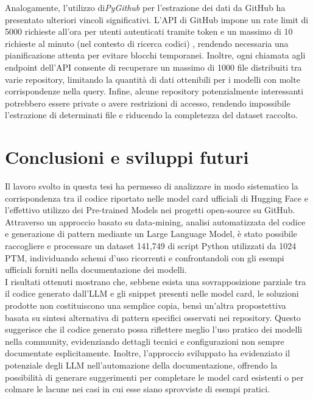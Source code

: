 \documentclass{article}
\begin{document}
Analogamente, l’utilizzo di\textit{PyGithub} per l'estrazione dei dati da GitHub ha presentato ulteriori vincoli significativi. L’API di GitHub impone un rate limit di 5000 richieste all’ora per utenti autenticati tramite token e un massimo di 10 richieste al minuto (nel contesto di ricerca codici) , rendendo necessaria una pianificazione attenta per evitare blocchi temporanei. Inoltre, ogni chiamata agli endpoint dell’API consente di recuperare un massimo di 1000 file distribuiti tra varie repository, limitando la quantità di dati ottenibili per i modelli con molte corrispondenze nella query. Infine, alcune repository potenzialmente interessanti potrebbero essere private o avere restrizioni di accesso, rendendo impossibile l’estrazione di determinati file e riducendo la completezza del dataset raccolto.

\section{Conclusioni e sviluppi futuri}
Il lavoro svolto in questa tesi ha permesso di analizzare in modo sistematico la corrispondenza tra il codice riportato nelle model card ufficiali di Hugging Face e l’effettivo utilizzo dei Pre-trained Models nei progetti open-source su GitHub. Attraverso un approccio basato su data-mining, analisi automatizzata del codice e generazione di pattern mediante un Large Language Model, è stato possibile raccogliere e processare un dataset 141,749 di script Python utilizzati da 1024 PTM, individuando schemi d’uso ricorrenti e confrontandoli con gli esempi ufficiali forniti nella documentazione dei modelli.\\
I risultati ottenuti mostrano che, sebbene esista una sovrapposizione parziale tra il codice generato dall’LLM e gli snippet presenti nelle model card, le soluzioni prodotte non costituiscono una semplice copia, bensì un'altra propostettiva basata su sintesi alternativa di pattern specifici osservati nei repository. Questo suggerisce che il codice generato possa riflettere meglio l’uso pratico dei modelli nella community, evidenziando dettagli tecnici e configurazioni non sempre documentate esplicitamente. Inoltre, l’approccio sviluppato ha evidenziato il potenziale degli LLM nell’automazione della documentazione, offrendo la possibilità di generare suggerimenti per completare le model card esistenti o per colmare le lacune nei casi in cui esse siano sprovviste di esempi pratici.\\
\end{document}
